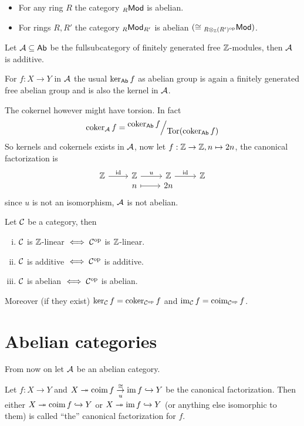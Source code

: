 \documentclass[a4paper]{report}
\begin{document}
\begin{exmp}
\begin{itemize}
  \item For any ring $R$ the category ${}_R\mathsf{Mod}$ is abelian.
        \item For rings $R, R'$ the category ${}_R\mathsf{Mod}_{R'}$ is abelian $( \cong {}_{R \otimes_{\mathbb{Z}}(R')^\mathrm{op}}\mathsf{Mod} )$.
\end{itemize}
\end{exmp}

\begin{exmp}
    \item Let $\mathcal{A} \subseteq \mathsf{Ab}$ be the fullsubcategory of finitely generated free $\mathbb{Z}$-modules, then $\mathcal{A}$ is additive.
    \item For $f: X \to Y$ in $\mathcal{A}$ the usual $\ker_{\mathsf{Ab}} f$ as abelian group is again a finitely generated free abelian group and is also the kernel in $\mathcal{A}$.
    \item The cokernel however might have torsion. In fact \[\coker_{\A} f = \fak{\coker_{\Ab} f}{\Tor(\coker_{\Ab} f)}\]
          So kernels and cokernels exists in $\mathcal{A}$, now let $f: \mathbb{Z} \to \mathbb{Z}, n \mapsto 2n$, the canonical factorization is \[\begin{tikzcd}
\Z \arrow[r, "\id"] & \Z \arrow[r, "u"]    & \Z \arrow[r, "\id"] & \Z \\[-20]
                    & n \arrow[r, maps to] & 2n                  &
\end{tikzcd}\]since $u$ is not an isomorphism, $\mathcal{A}$ is not abelian.
\end{exmp}


\begin{prop}
  Let $\mathcal{C}$ be a category, then
 \begin{enumerate}[(i)]
   \item $\mathcal{C}$ is $\mathbb{Z}$-linear $\iff \mathcal{C}^\mathrm{op}$ is $\mathbb{Z}$-linear.
   \item $\mathcal{C}$ is additive $\iff \mathcal{C}^\mathrm{op}$ is additive.
         \item $\mathcal{C}$ is abelian $\iff \mathcal{C}^\mathrm{op}$ is abelian.
 \end{enumerate}
 Moreover (if they exist) $\ker_{\mathcal{C}} f = \operatorname{coker} _{\mathcal{C}^\mathrm{op}} f$ and $\operatorname{im}_{\mathcal{C}} f = \operatorname{coim}_{\mathcal{C}^\mathrm{op}} f$.
\end{prop}


\section{Abelian categories}
From now on let $\mathcal{A}$ be an abelian category.
\begin{rem*}
Let $f: X \to Y$ and $X \twoheadrightarrow \coim f \overunderset \cong u \rightarrow \im f \hookrightarrow Y$ be the canonical factorization. Then either $X \twoheadrightarrow \operatorname{coim} f \hookrightarrow Y$ or $X \twoheadrightarrow \operatorname{im} f \hookrightarrow Y$ (or anything else isomorphic to them) is called ``the'' canonical factorization for $f$.
\end{rem*}
\end{document}

